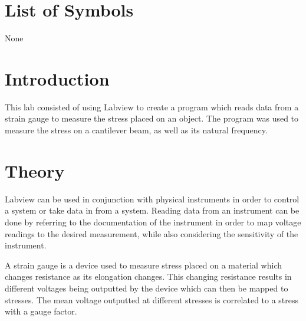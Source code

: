 \documentclass[12pt]{article}
\begin{document}

\tableofcontents

\listoffigures

\bigskip


\section*{\fontsize{12}{12}\selectfont \large List of Symbols}
None




\newpage



\section*{\fontsize{12}{12}\selectfont \large Introduction}

This lab consisted of using Labview to create a program which reads data from a strain gauge to measure the stress placed on an object. The program was used to measure the stress on a cantilever beam, as well as its natural frequency.


\section*{\fontsize{12}{12}\selectfont \large Theory}

Labview can be used in conjunction with physical instruments in order to control a system or take data in from a system. Reading data from an instrument can be done by referring to the documentation of the instrument in order to map voltage readings to the desired measurement, while also considering the sensitivity of the instrument. 
\bigskip

A strain gauge is a device used to measure stress placed on a material which changes resistance as its elongation changes. This changing resistance results in different voltages being outputted by the device which can then be mapped to stresses. The mean voltage outputted at different stresses is correlated to a stress with a gauge factor. 
\bigskip
\end{document}
